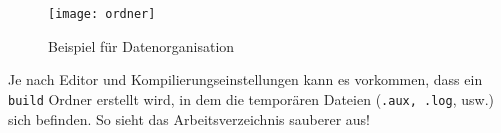 \begin{figure}[H]
	\centering
	\texttt{[image: ordner]}
	\caption{Beispiel für Datenorganisation}
\end{figure}

Je nach Editor und Kompilierungseinstellungen
kann es vorkommen, dass ein \texttt{build} Ordner
erstellt wird, in dem die temporären Dateien 
(\texttt{.aux, .log}, usw.) sich befinden.
So sieht das Arbeitsverzeichnis sauberer aus!
